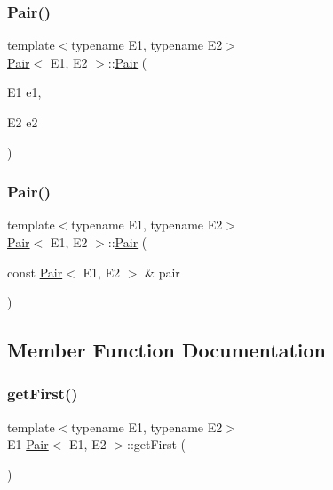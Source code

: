\subsubsection{\texorpdfstring{Pair()}{Pair()}\hspace{0.1cm}{\footnotesize\ttfamily [1/2]}}
{\footnotesize\ttfamily template$<$typename E1, typename E2$>$ \\
\hyperlink{classPair}{Pair}$<$ E1, E2 $>$\+::\hyperlink{classPair}{Pair} (\begin{DoxyParamCaption}\item[{E1}]{e1,  }\item[{E2}]{e2 }\end{DoxyParamCaption})\hspace{0.3cm}{\ttfamily [inline]}}

\mbox{\label{classPair_af8ffd06c98b76caa0ef3cfbbb610d8f3}} 
\subsubsection{\texorpdfstring{Pair()}{Pair()}\hspace{0.1cm}{\footnotesize\ttfamily [2/2]}}
{\footnotesize\ttfamily template$<$typename E1, typename E2$>$ \\
\hyperlink{classPair}{Pair}$<$ E1, E2 $>$\+::\hyperlink{classPair}{Pair} (\begin{DoxyParamCaption}\item[{const \hyperlink{classPair}{Pair}$<$ E1, E2 $>$ \&}]{pair }\end{DoxyParamCaption})\hspace{0.3cm}{\ttfamily [inline]}}



\subsection{Member Function Documentation}
\mbox{\label{classPair_a5d9bb4e73cbf094f3554b82a6f58f913}} 
\subsubsection{\texorpdfstring{get\+First()}{getFirst()}}
{\footnotesize\ttfamily template$<$typename E1, typename E2$>$ \\
E1 \hyperlink{classPair}{Pair}$<$ E1, E2 $>$\+::get\+First (\begin{DoxyParamCaption}{ }\end{DoxyParamCaption})\hspace{0.3cm}{\ttfamily [inline]}}

